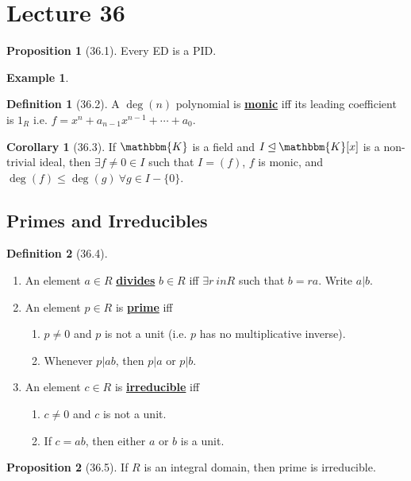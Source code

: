 \documentclass{article}
\newcommand{\define}[1]{\textbf{\underline{#1}}}
\theoremstyle{definition}
\newtheorem*{defn}{Definition}
\newtheorem*{cor}{Corollary}
\newtheorem*{prop}{Proposition}
\newtheorem*{ex}{Example}
\theoremstyle{remark}
\newcommand{\ideal}{\unlhd}
\newcommand{\K}{\mathbbm{K}}
\begin{document}
    \section*{Lecture 36}{
        \begin{prop}[36.1]
            Every ED is a PID.
        \end{prop}
        
        \begin{ex}
            \begin{defn}[36.2]
                A $\deg(n)$ polynomial is \define{monic} iff its leading coefficient is $1_R$ i.e. $f=x^n+a_{n-1}x^{n-1}+\cdots+a_0$.
            \end{defn}
            \begin{cor}[36.3]
                If $\K$ is a field and $I \ideal \K[x]$ is a non-trivial ideal, then $\exists f\neq 0 \in I$ such that $I=(f)$, $f$ is monic, and $\deg(f) \leq \deg(g) \ \forall g\in I-\{0\}$.
            \end{cor}
        \end{ex}
        
        \subsection*{Primes and Irreducibles}{
            \begin{defn}[36.4]
                \begin{enumerate}
                    \item An element $a \in R$ \define{divides} $b\in R$ iff $\exists r\ in R$ such that $b=ra$. Write $a|b$.
                    \item An element $p \in R$ is \define{prime} iff
                    \begin{enumerate}
                        \item $p\neq 0$ and $p$ is not a unit (i.e. $p$ has no multiplicative inverse).
                        \item Whenever $p|ab$, then $p|a$ or $p|b$.
                    \end{enumerate}
                    \item An element $c \in R$ is \define{irreducible} iff
                    \begin{enumerate}
                        \item $c\neq 0$ and $c$ is not a unit.
                        \item If $c=ab$, then either $a$ or $b$ is a unit.
                    \end{enumerate}
                \end{enumerate}
            \end{defn}
            
            \begin{prop}[36.5]
                If $R$ is an integral domain, then prime is irreducible.
            \end{prop}
        }
    }
\end{document}
